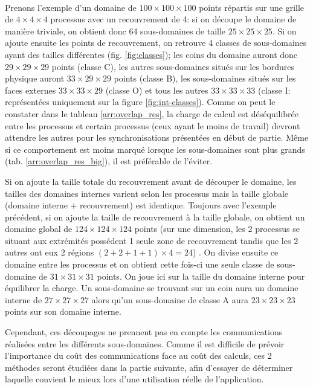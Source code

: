 \paragraph{}Prenons l'exemple d'un domaine de $100\times100\times100$ points répartis sur une grille de $4\times4\times4$ processus avec un recouvrement de 4: si on découpe le domaine de manière triviale, on obtient donc 64 sous-domaines de taille $25\times25\times25$. Si on ajoute ensuite les points de recouvrement, on retrouve 4 classes de sous-domaines ayant des tailles différentes (fig. \ref{fig:classes}); les coins du domaine auront donc $29\times29\times29$ points (classe C), les autres sous-domaines situés sur les bordures physique auront $33\times29\times29$ points (classe B), les sous-domaines situés sur les faces externes $33\times33\times29$ (classe O) et tous les autres $33\times33\times33$ (classe I: représentées uniquement sur la figure \ref{fig:int-classes}). Comme on peut le constater dans le tableau \ref{arr:overlap_res}, la charge de calcul est déséquilibrée entre les processus et certain processus (ceux ayant le moins de travail) devront attendre les autres pour les synchronisations présentées en début de partie. Même si ce comportement est moins marqué lorsque les sous-domaines sont plus grands (tab. \ref{arr:overlap_res_big}), il est préférable de l'éviter.
  
Si on ajoute la taille totale du recouvrement avant de découper le domaine, les tailles des domaines internes varient selon les processus mais la taille globale (domaine interne + recouvrement) est identique. Toujours avec l'exemple précédent, si on ajoute la taille de recouvrement à la taille globale, on obtient un domaine global de $124\times124\times124$ points (sur une dimension, les 2 processus se situant aux extrémités possédent 1 seule zone de recouvrement tandis que les 2 autres ont eux 2 régions $(2+2+1+1)\times4=24$) . On divise ensuite ce domaine entre les processus et on obtient cette fois-ci une seule classe de sous-domaine de $31\times31\times31$ points. On joue ici sur la taille du domaine interne pour équilibrer la charge. Un sous-domaine se trouvant sur un coin aura un domaine interne de $27\times27\times27$ alors qu'un sous-domaine de classe A aura $23\times23\times23$ points sur son domaine interne.

Cependant, ces découpages ne prennent pas en compte les communications réalisées entre les différents sous-domaines. Comme il est difficile de prévoir l'importance du coût des communications face au coût des calculs, ces 2 méthodes seront étudiées dans la partie suivante, afin d'essayer de déterminer laquelle convient le mieux lors d'une utilisation réelle de l'application.


